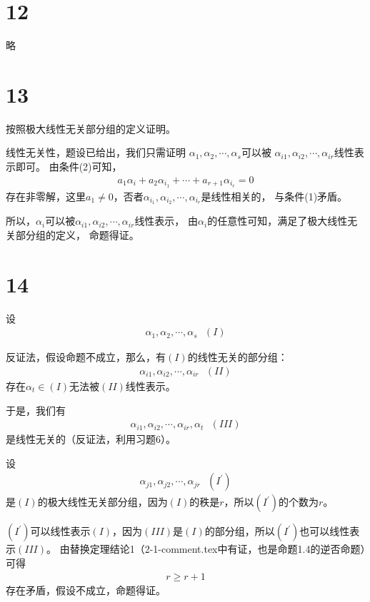 \documentclass{article}
\begin{document}
\section*{12}

略

\section*{13}

按照极大线性无关部分组的定义证明。

线性无关性，题设已给出，我们只需证明
$\alpha_1, \alpha_2, \cdots, \alpha_s$可以被
$\alpha_{i1}, \alpha_{i2}, \cdots, \alpha_{ir}$线性表示即可。
由条件(2)可知，
\begin{align*}
  a_1 \alpha_i + a_2 \alpha_{i_1} + \cdots + a_{r + 1} \alpha_{i_r} = 0
\end{align*}
存在非零解，这里$a_1 \neq 0$，否者$\alpha_{i_1}, \alpha_{i_2}, \cdots, \alpha_{i_r}$是线性相关的，
与条件(1)矛盾。

所以，$\alpha_i$可以被$\alpha_{i1}, \alpha_{i2}, \cdots, \alpha_{ir}$线性表示，
由$\alpha_i$的任意性可知，满足了极大线性无关部分组的定义，
命题得证。


\section*{14}

设
\begin{align*}
  \alpha_1, \alpha_2, \cdots, \alpha_s \ \ \ (I)
\end{align*}

反证法，假设命题不成立，那么，有$(I)$的线性无关的部分组：
\begin{align*}
  \alpha_{i1}, \alpha_{i2}, \cdots, \alpha_{ir} \ \ \ (II)
\end{align*}
存在$\alpha_t \in (I)$无法被$(II)$线性表示。

于是，我们有
\begin{align*}
  \alpha_{i1}, \alpha_{i2}, \cdots, \alpha_{ir}, \alpha_t  \ \ \ (III)
\end{align*}
是线性无关的（反证法，利用习题6）。

设
\begin{align*}
  \alpha_{j1}, \alpha_{j2}, \cdots, \alpha_{jr} \ \ \ (I^\prime)
\end{align*}
是$(I)$的极大线性无关部分组，因为$(I)$的秩是$r$，所以$(I^\prime)$的个数为$r$。

$(I^\prime)$可以线性表示$(I)$，因为$(III)$是$(I)$的部分组，所以$(I^\prime)$也可以线性表示$(III)$。
由替换定理结论1（2-1-comment.tex中有证，也是命题1.4的逆否命题）可得
\begin{align*}
  r \geq r + 1
\end{align*}
存在矛盾，假设不成立，命题得证。
\end{document}

